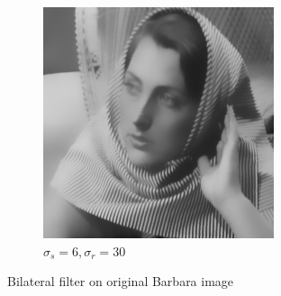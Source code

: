 \documentclass[a4paper, landscape]{article}
\begin{document}
\begin{figure}
\begin{subfigure}{0.48\linewidth}
        \includegraphics[width=\linewidth]{barbara256,σ_spatial6,σ_range30.png}
        \caption{$\sigma_s=6, \sigma_r=30$}
    \end{subfigure}
    \caption{Bilateral filter on original Barbara image}
    \label{fig:bs}
\end{figure}
\end{document}
